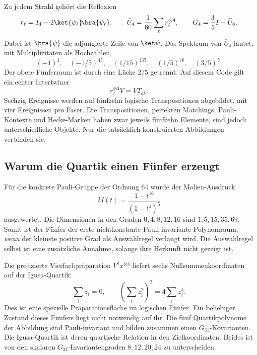 Zu jedem Strahl gehört die Reflexion
\begin{equation}
r_\ell=I_4-2\ket{\psi_\ell}\!\bra{\psi_\ell},
\qquad \bar U_4=\frac1{60}\sum_\ell r_\ell^{\otimes4},
\qquad G_4=\frac35I-\bar U_4.
\end{equation}
Dabei ist $\bra{\psi}$ die adjungierte Zeile von $\ket\psi$. Das Spektrum von $\bar U_4$ lautet, mit Multiplizitäten als Hochzahlen,
\begin{equation}
(-1)^1,\quad(-1/5)^{45},\quad(1/15)^{135},\quad(1/5)^{70},\quad(3/5)^5.
\end{equation}
Der obere Fünferraum ist durch eine Lücke $2/5$ getrennt. Auf diesem Code gilt ein echter Intertwiner
\begin{equation}
r_\ell^{\otimes4}V=VT_{ab}.
\end{equation}
Sechzig Ereignisse werden auf fünfzehn logische Transpositionen abgebildet, mit vier Ereignissen pro Faser. Die Transpositionen, perfekten Matchings, Pauli-Kontexte und Hecke-Marken haben zwar jeweils fünfzehn Elemente, sind jedoch unterschiedliche Objekte. Nur die tatsächlich konstruierten Abbildungen verbinden sie.

\subsection{Warum die Quartik einen Fünfer erzeugt}
Für die konkrete Pauli-Gruppe der Ordnung 64 wurde der Molien-Ausdruck
\begin{equation}
M(t)=\frac{1-t^{16}}{(1-t^4)^5}
\end{equation}
ausgewertet. Die Dimensionen in den Graden $0,4,8,12,16$ sind $1,5,15,35,69$. Somit ist der Fünfer der erste nichtkonstante Pauli-invariante Polynomraum, \emph{wenn} der kleinste positive Grad als Auswahlregel verlangt wird. Die Auswahlregel selbst ist eine zusätzliche Annahme, solange ihre Herkunft nicht gezeigt ist.

Die projizierte Vierfachpräparation $V^\dagger x^{\otimes4}$ liefert sechs Nullsummenkoordinaten auf der Igusa-Quartik:
\begin{equation}
\sum_i z_i=0,\qquad
\left(\sum_i z_i^2\right)^2=4\sum_i z_i^4.
\end{equation}
Dies ist eine spezielle Präparationsfläche im logischen Fünfer. Ein beliebiger Zustand dieses Fünfers liegt nicht notwendig auf ihr. Die fünf Quartikpolynome der Abbildung sind Pauli-invariant und bilden zusammen einen $G_{31}$-Kovarianten. Die Igusa-Quartik ist deren quartische Relation in den Zielkoordinaten. Beides ist von den skalaren $G_{31}$-Invariantengraden $8,12,20,24$ zu unterscheiden.

